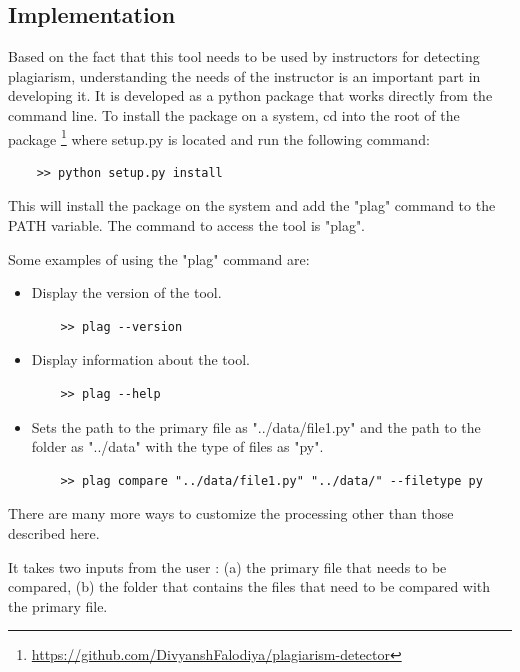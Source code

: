 \documentclass[12pt]{article}
\begin{document}
\subsection{Implementation}
Based on the fact that this tool needs to be used by instructors for detecting plagiarism, understanding the needs of the instructor is an important part in developing it. It is developed as a python package that works directly from the command line. To install the package on a system, cd into the root of the package \footnote{\url{https://github.com/DivyanshFalodiya/plagiarism-detector}} where setup.py is located and run the following command:
\begin{verbatim}
    >> python setup.py install
\end{verbatim}
This will install the package on the system and add the "plag" command to the PATH variable.
The command to access the tool is "plag".\par
Some examples of using the "plag" command are:
\begin{itemize}
    \item Display the version of the tool.
    \begin{verbatim}
    >> plag --version
    \end{verbatim}
    
    \item Display information about the tool.
    \begin{verbatim}
    >> plag --help
    \end{verbatim}
    
    \item Sets the path to the primary file as "../data/file1.py" and the path to the folder as "../data" with the type of files as "py".
    \begin{verbatim}
    >> plag compare "../data/file1.py" "../data/" --filetype py
    \end{verbatim}
\end{itemize}
There are many more ways to customize the processing other than those described here. \par
It takes two inputs from the user : (a) the primary file that needs to be compared, (b) the folder that contains the files that need to be compared with the primary file. \par
\end{document}
